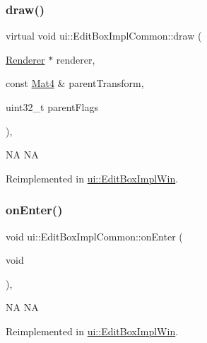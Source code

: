\subsubsection{\texorpdfstring{draw()}{draw()}\hspace{0.1cm}{\footnotesize\ttfamily [2/2]}}
{\footnotesize\ttfamily virtual void ui\+::\+Edit\+Box\+Impl\+Common\+::draw (\begin{DoxyParamCaption}\item[{\hyperlink{classRenderer}{Renderer} $\ast$}]{renderer,  }\item[{const \hyperlink{classMat4}{Mat4} \&}]{parent\+Transform,  }\item[{uint32\+\_\+t}]{parent\+Flags }\end{DoxyParamCaption})\hspace{0.3cm}{\ttfamily [override]}, {\ttfamily [virtual]}}

NA  NA 

Reimplemented in \hyperlink{classui_1_1EditBoxImplWin_a8709f6415ecea16cd9a09eb3fddc2d6a}{ui\+::\+Edit\+Box\+Impl\+Win}.

\mbox{\label{classui_1_1EditBoxImplCommon_a101c957f01d0323c0f9ed0d5f649a408}} 
\subsubsection{\texorpdfstring{on\+Enter()}{onEnter()}\hspace{0.1cm}{\footnotesize\ttfamily [1/2]}}
{\footnotesize\ttfamily void ui\+::\+Edit\+Box\+Impl\+Common\+::on\+Enter (\begin{DoxyParamCaption}\item[{void}]{ }\end{DoxyParamCaption})\hspace{0.3cm}{\ttfamily [override]}, {\ttfamily [virtual]}}

NA  NA 

Reimplemented in \hyperlink{classui_1_1EditBoxImplWin_a9cdc66776f0b0d70318866b0e4a3bfa7}{ui\+::\+Edit\+Box\+Impl\+Win}.

\mbox{\label{classui_1_1EditBoxImplCommon_af69080c62e8be3ded9074a1e891761e7}} 
